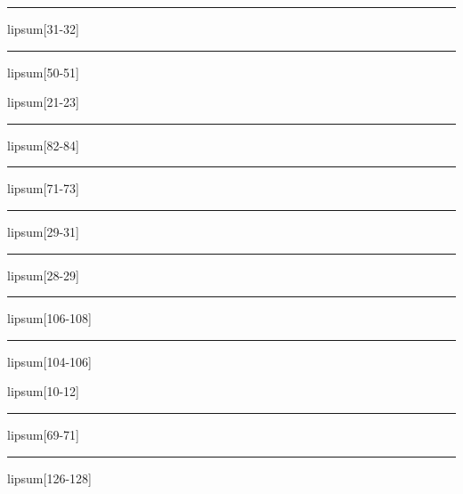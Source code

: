 \documentclass[11pt,a4paper]{article}
\begin{document}
\begin{simplewrap}
  \textcolor{blue!42}{\rule{4.7cm}{6.1cm}}
\end{simplewrap}
lipsum[31-32]

\begin{simplewrap}
  \textcolor{blue!21}{\rule{5.8cm}{3.3cm}}
\end{simplewrap}
lipsum[50-51]

lipsum[21-23]

\begin{simplewrap}
  \textcolor{olive!22}{\rule{6.0cm}{7.0cm}}
\end{simplewrap}
lipsum[82-84]

\begin{simplewrap}
  \textcolor{green!15}{\rule{4.2cm}{5.2cm}}
\end{simplewrap}
lipsum[71-73]

\begin{simplewrap}
  \textcolor{red!60}{\rule{5.1cm}{6.7cm}}
\end{simplewrap}
lipsum[29-31]

\begin{simplewrap}
  \textcolor{purple!46}{\rule{4.8cm}{8.1cm}}
\end{simplewrap}
lipsum[28-29]

\begin{simplewrap}
  \textcolor{orange!60}{\rule{3.9cm}{6.3cm}}
\end{simplewrap}
lipsum[106-108]

\begin{simplewrap}
  \textcolor{red!46}{\rule{4.8cm}{2.3cm}}
\end{simplewrap}
lipsum[104-106]

lipsum[10-12]

\begin{simplewrap}
  \textcolor{pink!31}{\rule{5.1cm}{2.4cm}}
\end{simplewrap}
lipsum[69-71]

\begin{simplewrap}
  \textcolor{red!31}{\rule{5.5cm}{4.4cm}}
\end{simplewrap}
lipsum[126-128]
\end{document}
